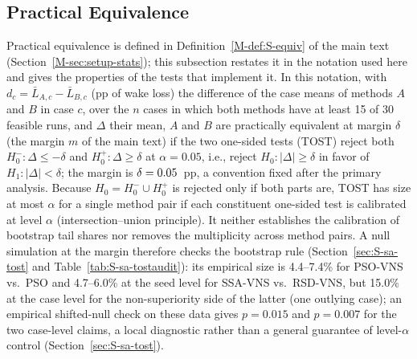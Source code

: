 \subsection{Practical Equivalence}
\label{sec:S-th-equiv}
Practical equivalence is defined in Definition~\ref{M-def:S-equiv} of the main text (Section~\ref{M-sec:setup-stats}); this subsection restates it in the notation used here and gives the properties of the tests that implement it. In this notation, with $d_c=\bar L_{A,c}-\bar L_{B,c}$ (pp of wake loss) the difference of the case means of methods $A$ and $B$ in case $c$, over the $n$ cases in which both methods have at least 15 of 30 feasible runs, and $\Delta$ their mean, $A$ and $B$ are practically equivalent at margin $\delta$ (the margin $m$ of the main text) if the two one-sided tests (TOST) reject both $H_0^-\colon\Delta\le-\delta$ and $H_0^+\colon\Delta\ge\delta$ at $\alpha=0.05$, i.e., reject $H_0\colon\lvert\Delta\rvert\ge\delta$ in favor of $H_1\colon\lvert\Delta\rvert<\delta$; the margin is $\delta=0.05$~pp, a convention fixed after the primary analysis.
Because $H_0=H_0^-\cup H_0^+$ is rejected only if both parts are, TOST has size at most $\alpha$ for a single method pair if each constituent one-sided test is calibrated at level $\alpha$ (intersection--union principle). It neither establishes the calibration of bootstrap tail shares nor removes the multiplicity across method pairs. A null simulation at the margin therefore checks the bootstrap rule (Section~\ref{sec:S-sa-tost} and Table~\ref{tab:S-sa-tostaudit}): its empirical size is 4.4--7.4\% for PSO-VNS vs.\ PSO and 4.7--6.0\% at the seed level for SSA-VNS vs.\ RSD-VNS, but 15.0\% at the case level for the non-superiority side of the latter (one outlying case); an empirical shifted-null check on these data gives $p=0.015$ and $p=0.007$ for the two case-level claims, a local diagnostic rather than a general guarantee of level-$\alpha$ control (Section~\ref{sec:S-sa-tost}).


